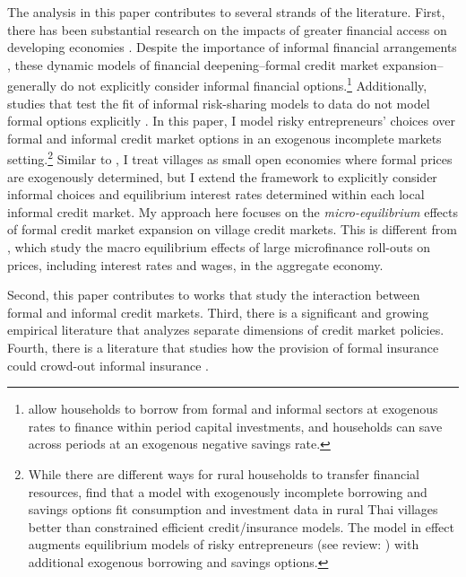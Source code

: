 The analysis in this paper contributes to several strands of the literature. First, there has been substantial research on the impacts of greater financial access on developing economies \autocite{greenwood_financial_1990, banerjee_occupational_1993, lloyd-ellis_enterprise_2000, gine_evaluation_2004, greenwood_financing_2010, kaboski_structural_2011, moll_productivity_2014, buera_macroeconomics_2012, NBERw20821}. Despite the importance of informal financial arrangements \autocite{udry_risk_1994, townsend_risk_1994}, these dynamic models of financial deepening--formal credit market expansion--generally do not explicitly consider informal financial options.\footnote{\textcite{banerjee_credit_2017} allow households to borrow from formal and informal sectors at exogenous rates to finance within period capital investments, and households can save across periods at an exogenous negative savings rate.} Additionally, studies that test the fit of informal risk-sharing models to data do not model formal options explicitly \autocite{alem_evaluation_2014, karaivanov_dynamic_2014, KinnanThai}. In this paper, I model risky entrepreneurs' choices over formal and informal credit market options in an exogenous incomplete markets setting.\footnote{While there are different ways for rural households to transfer financial resources, \textcite{karaivanov_dynamic_2014} find that a model with exogenously incomplete borrowing and savings options fit consumption and investment data in rural Thai villages better than constrained efficient credit/insurance models. The model in effect augments equilibrium models of risky entrepreneurs (see review: \textcite{quadrini_entrepreneurship_2009}) with additional exogenous borrowing and savings options.} Similar to \textcite{kaboski_structural_2011}, I treat villages as small open economies where formal prices are exogenously determined, but I extend the framework to explicitly consider informal choices and equilibrium interest rates determined within each local informal credit market. My approach here focuses on the \textit{micro-equilibrium} effects of formal credit market expansion on village credit markets. This is different from \textcite{buera_macroeconomics_2012, BrezaKinnanNBERw24329}, which study the macro equilibrium effects of large microfinance roll-outs on prices, including interest rates and wages, in the aggregate economy.

Second, this paper contributes to works that study the interaction between formal and informal credit markets. Third, there is a significant and growing empirical literature that analyzes separate dimensions of credit market policies. Fourth, there is a literature that studies how the provision of formal insurance could crowd-out informal insurance \autocite{attanasio_consumption_2000,krueger_public_2011,ChandrasekharKinnanLarreguy}.

